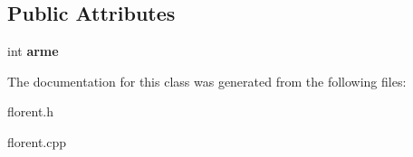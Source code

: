 \subsection*{Public Attributes}
\begin{DoxyCompactItemize}
\item 
\mbox{\label{classAnimauxDeFlorent_af04cb1ffb17ba177f70ee756cc09c1d7}} 
int {\bfseries arme}
\end{DoxyCompactItemize}


The documentation for this class was generated from the following files\+:\begin{DoxyCompactItemize}
\item 
florent.\+h\item 
florent.\+cpp\end{DoxyCompactItemize}
